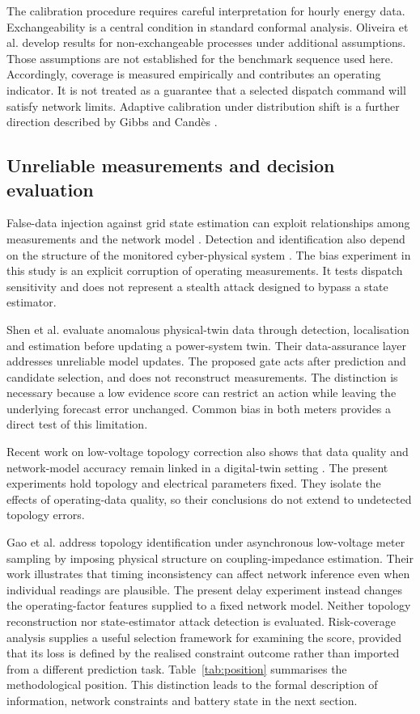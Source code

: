 \documentclass[preprint,12pt]{elsarticle}
\begin{document}
The calibration procedure requires careful interpretation for hourly energy data. Exchangeability is a central condition in standard conformal analysis. Oliveira et al. \cite{oliveira} develop results for non-exchangeable processes under additional assumptions. Those assumptions are not established for the benchmark sequence used here. Accordingly, coverage is measured empirically and contributes an operating indicator. It is not treated as a guarantee that a selected dispatch command will satisfy network limits. Adaptive calibration under distribution shift is a further direction described by Gibbs and Cand\`es \cite{gibbs}.

\subsection{Unreliable measurements and decision evaluation}
False-data injection against grid state estimation can exploit relationships among measurements and the network model \cite{liu}. Detection and identification also depend on the structure of the monitored cyber-physical system \cite{pasqualetti}. The bias experiment in this study is an explicit corruption of operating measurements. It tests dispatch sensitivity and does not represent a stealth attack designed to bypass a state estimator.

Shen et al. \cite{shen} evaluate anomalous physical-twin data through detection, localisation and estimation before updating a power-system twin. Their data-assurance layer addresses unreliable model updates. The proposed gate acts after prediction and candidate selection, and does not reconstruct measurements. The distinction is necessary because a low evidence score can restrict an action while leaving the underlying forecast error unchanged. Common bias in both meters provides a direct test of this limitation.

Recent work on low-voltage topology correction also shows that data quality and network-model accuracy remain linked in a digital-twin setting \cite{dongliu}. The present experiments hold topology and electrical parameters fixed. They isolate the effects of operating-data quality, so their conclusions do not extend to undetected topology errors.

Gao et al. \cite{gao} address topology identification under asynchronous low-voltage meter sampling by imposing physical structure on coupling-impedance estimation. Their work illustrates that timing inconsistency can affect network inference even when individual readings are plausible. The present delay experiment instead changes the operating-factor features supplied to a fixed network model. Neither topology reconstruction nor state-estimator attack detection is evaluated. Risk-coverage analysis \cite{geifman} supplies a useful selection framework for examining the score, provided that its loss is defined by the realised constraint outcome rather than imported from a different prediction task.
 Table~\ref{tab:position} summarises the methodological position. This distinction leads to the formal description of information, network constraints and battery state in the next section.
\end{document}
